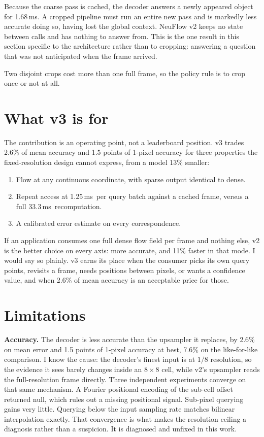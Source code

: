 \documentclass[11pt,a4paper]{article}
\newcommand{\ms}{\,ms}
\begin{document}
Because the coarse pass is cached, the decoder answers a newly appeared object
for 1.68\ms. A cropped pipeline must run an entire new pass and is markedly less
accurate doing so, having lost the global context. NeuFlow v2 keeps no state
between calls and has nothing to answer from. This is the one result in this
section specific to the architecture rather than to cropping: answering a
question that was not anticipated when the frame arrived.

Two disjoint crops cost more than one full frame, so the policy rule is to crop
once or not at all.

\section{What v3 is for}
The contribution is an operating point, not a leaderboard position. v3 trades
2.6\% of mean accuracy and 1.5 points of 1-pixel accuracy for three properties the
fixed-resolution design cannot express, from a model 13\% smaller:

\begin{enumerate}
\item Flow at any continuous coordinate, with sparse output identical to dense.
\item Repeat access at 1.25\ms\ per query batch against a cached frame, versus a
      full 33.3\ms\ recomputation.
\item A calibrated error estimate on every correspondence.
\end{enumerate}

If an application consumes one full dense flow field per frame and nothing else,
v2 is the better choice on every axis: more accurate, and 11\% faster in that mode.
I would say so plainly. v3 earns its place when the consumer picks its own query
points, revisits a frame, needs positions between pixels, or wants a confidence
value, and when 2.6\% of mean accuracy is an acceptable price for those.

\section{Limitations}
\label{sec:limitations}

\textbf{Accuracy.} The decoder is less accurate than the upsampler it replaces, by
2.6\% on mean error and 1.5 points of 1-pixel accuracy at best, 7.6\% on the
like-for-like comparison. I know the cause: the decoder's finest input is at $1/8$
resolution, so the evidence it sees barely changes inside an $8\times8$ cell, while
v2's upsampler reads the full-resolution frame directly. Three independent
experiments converge on that same mechanism. A Fourier positional encoding of the
sub-cell offset returned null, which rules out a missing positional signal. Sub-pixel
querying gains very little. Querying below the input sampling rate matches bilinear
interpolation exactly. That convergence is what makes the resolution ceiling a
diagnosis rather than a suspicion. It is diagnosed and unfixed in this work.
\end{document}
